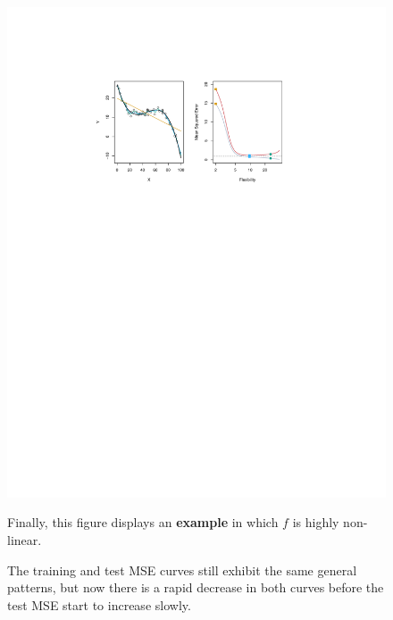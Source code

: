 \documentclass[a4paper]{article}
\newcommand{\example}[1]{\textcolor{Green4}{\textbf{#1}}}
\newcommand{\highspace}{\vspace{1.2em}\noindent}
\begin{document}
    \newpage

    \begin{figure}[!htp]
        \begin{examplebox}
            \begin{center}
                \includegraphics[width=\textwidth]{img/measuring-the-quality-of-fit-3.pdf}
                \label{fig: measuring the quality of fit - 3}
            \end{center}

            Finally, this figure displays an \example{example} in which $f$ is highly non-linear.

            \highspace
            The training and test MSE curves still exhibit the same general patterns, but now there is a rapid decrease in both curves before the test MSE start to increase slowly.
        \end{examplebox}
    \end{figure}
    
\end{document}
